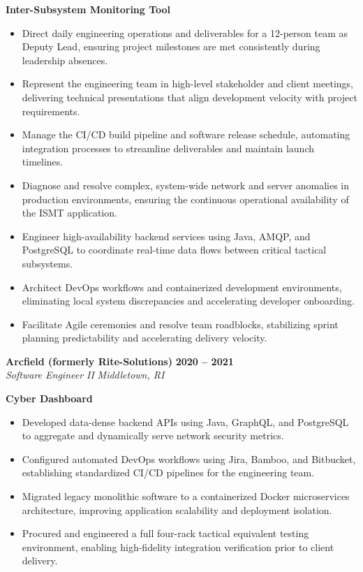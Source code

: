 \documentclass[10pt,letterpaper]{article}
\begin{document}
\vspace{1pt}
\noindent \textbf{Inter-Subsystem Monitoring Tool}
\begin{itemize}[leftmargin=*, label={$\bullet$}, itemsep=0.5pt, topsep=0pt, parsep=0pt]
    \item Direct daily engineering operations and deliverables for a 12-person team as Deputy Lead, ensuring project milestones are met consistently during leadership absences.
    \item Represent the engineering team in high-level stakeholder and client meetings, delivering technical presentations that align development velocity with project requirements.
    \item Manage the CI/CD build pipeline and software release schedule, automating integration processes to streamline deliverables and maintain launch timelines.
    \item Diagnose and resolve complex, system-wide network and server anomalies in production environments, ensuring the continuous operational availability of the ISMT application.
    \item Engineer high-availability backend services using Java, AMQP, and PostgreSQL to coordinate real-time data flows between critical tactical subsystems.
    \item Architect DevOps workflows and containerized development environments, eliminating local system discrepancies and accelerating developer onboarding.
    \item Facilitate Agile ceremonies and resolve team roadblocks, stabilizing sprint planning predictability and accelerating delivery velocity.
\end{itemize}

\vspace{4pt}
\noindent \textbf{Arcfield (formerly Rite-Solutions)} \hfill \textbf{2020 -- 2021} \\
\textit{Software Engineer II} \hfill \textit{Middletown, RI}

\vspace{1pt}
\noindent \textbf{Cyber Dashboard}
\begin{itemize}[leftmargin=*, label={$\bullet$}, itemsep=0.5pt, topsep=0pt, parsep=0pt]
    \item Developed data-dense backend APIs using Java, GraphQL, and PostgreSQL to aggregate and dynamically serve network security metrics.
    \item Configured automated DevOps workflows using Jira, Bamboo, and Bitbucket, establishing standardized CI/CD pipelines for the engineering team.
    \item Migrated legacy monolithic software to a containerized Docker microservices architecture, improving application scalability and deployment isolation.
    \item Procured and engineered a full four-rack tactical equivalent testing environment, enabling high-fidelity integration verification prior to client delivery.
\end{itemize}
\end{document}
